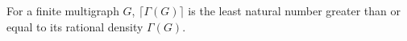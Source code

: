 \begin{definition}
For a finite multigraph $G$, $\lceil\Gamma(G)\rceil$ is the least natural
number greater than or equal to its rational density $\Gamma(G)$.
\end{definition}
